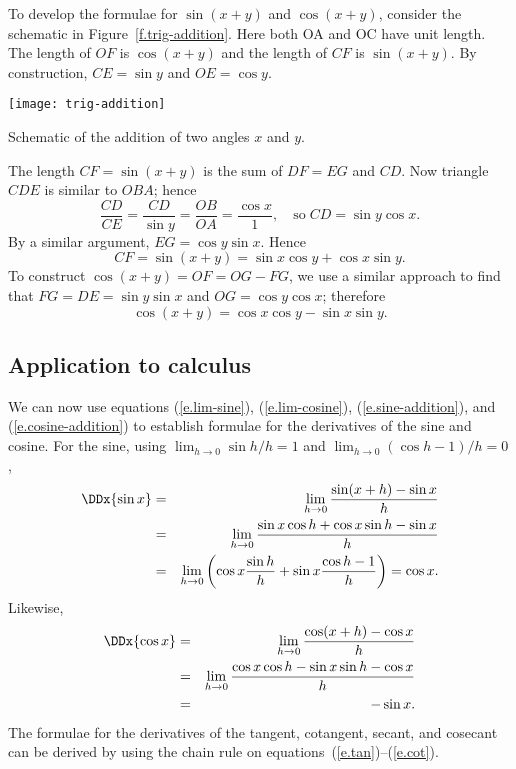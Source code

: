 To develop the formulae for $\sin(x+y)$ and $\cos(x+y)$, consider the schematic in Figure~\ref{f.trig-addition}. Here both OA and OC have unit length. The length of $OF$ is $\cos(x+y)$ and the length of $CF$ is $\sin(x+y)$.  By construction, $CE = \sin y$ and $OE = \cos y$.

\begin{marginfigure}
\texttt{[image: trig-addition]}
\caption[Schematic of the addition of two angles]{Schematic of the addition of two angles $x$ and $y$.}
\label{f.trig-addition}
\end{marginfigure}

The length $CF = \sin(x+y)$ is the sum of $DF = EG$ and $CD$.  Now triangle $CDE$ is similar to $OBA$; hence
\[ 
	\frac{CD}{CE} = \frac{CD}{\sin y} = \frac{OB}{OA} = \frac{\cos x}{1},\quad\textrm{so}
	\;CD = \sin y\cos x. 
\]
By a similar argument, $EG = \cos y \sin x$.  Hence
\begin{equation}\label{e.sine-addition}
	CF = \sin(x + y) = \sin x\cos y + \cos x\sin y.
\end{equation}
To construct $\cos(x+y) = OF = OG-FG$, we use a similar approach to find that $FG = DE = \sin y \sin x$ and $OG = \cos y \cos x$; therefore
\begin{equation}\label{e.cosine-addition}
	\cos(x+y) = \cos x \cos y - \sin x\sin y.
\end{equation}

\subsection{Application to calculus}

We can now use equations (\ref{e.lim-sine}), (\ref{e.lim-cosine}), (\ref{e.sine-addition}), and (\ref{e.cosine-addition}) to establish formulae for the derivatives of the sine and cosine.  For the sine, using $\lim_{h\to 0}\sin h/h = 1$ and $\lim_{h\to 0}(\cos h - 1)/h = 0$,
\begin{eqnarray}
	\DDx{\sin x} &=& \lim_{h\to 0}\frac{\sin(x+h)-\sin x}{h}\nonumber\\
		&=& \lim_{h\to 0}\frac{\sin x\cos h + \cos x \sin h - \sin x}{h}\nonumber\\
		&=& \lim_{h\to0}\left(\cos x\frac{\sin h}{h} + \sin x\frac{\cos h-1}{h}\right) = \cos x. \label{e.dsin}
\end{eqnarray}
Likewise,
\begin{eqnarray}
	\DDx{\cos x} &=& \lim_{h\to 0}\frac{\cos(x+h)-\cos x}{h}\nonumber\\
		&=& \lim_{h\to 0}\frac{\cos x\cos h - \sin x \sin h - \cos x}{h}\nonumber\\
		&=& -\sin x. \label{e.dcos}
\end{eqnarray}
The formulae for the derivatives of the tangent, cotangent, secant, and cosecant can be derived by using the chain rule on equations~(\ref{e.tan})--(\ref{e.cot}).

